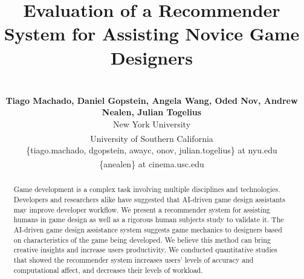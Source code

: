\documentclass[letterpaper]{article} %
\title{Evaluation of a Recommender System for Assisting Novice Game Designers}
\author{\Large \textbf{} \\ \Large \textbf{Tiago Machado, Daniel Gopstein, Angela Wang, Oded Nov, \textsuperscript{\rm *}Andrew Nealen, Julian Togelius}\\ %
New York University\\
\textsuperscript{\rm *} University of Southern California\\
\{tiago.machado, dgopstein, awayc, onov, julian.togelius\} at nyu.edu \\%
\textsuperscript{\rm*}\{anealen\} at cinema.usc.edu
}
\begin{document}
\maketitle

\begin{abstract}
Game development is a complex task involving multiple
disciplines  and  technologies.
Developers and researchers alike have suggested that AI-driven game design assistants may improve developer workflow.
We
present a recommender system for assisting humans in game
design as well as a rigorous human subjects study to validate it.  The AI-driven game design assistance system suggests game mechanics to designers based on characteristics of the game
being developed.  We believe this method can
bring creative insights and increase users productivity.  We
conducted quantitative studies that showed the recommender system increases
users' levels of accuracy and computational affect, and decreases their levels
of workload.
\end{abstract}
\end{document}
